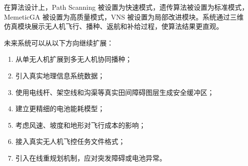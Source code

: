 \documentclass[UTF8,a4paper,12pt]{ctexart}
\begin{document}
在算法设计上，Path Scanning 被设置为快速模式，遗传算法被设置为标准模式，MemeticGA 被设置为高质量模式，VNS 被设置为局部改进模块。系统通过三维仿真模块展示无人机飞行、播种、返航和补给过程，使算法结果更直观。

未来系统可以从以下方向继续扩展：

\begin{enumerate}
    \item 从单无人机扩展到多无人机协同播种；
    \item 引入真实地理信息系统数据；
    \item 使用电线杆、架空线和沟渠等真实田间障碍图层生成安全缓冲区；
    \item 建立更精细的电池能耗模型；
    \item 考虑风速、坡度和地形对飞行成本的影响；
    \item 接入真实无人机飞控任务文件格式；
    \item 引入在线重规划机制，应对突发障碍或电池异常。
\end{enumerate}
\end{document}
